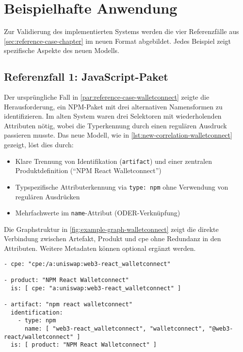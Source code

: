 \section{Beispielhafte Anwendung}\label{sec:beispiele-fertige-implementierung}

Zur Validierung des implementierten Systems werden die vier Referenzfälle aus \autoref{sec:reference-case-chapter} im neuen Format abgebildet.
Jedes Beispiel zeigt spezifische Aspekte des neuen Modells.

\subsection{Referenzfall 1: JavaScript-Paket}\label{subsec:example-js-package}

Der ursprüngliche Fall in \autoref{par:reference-case-walletconnect} zeigte die Herausforderung, ein NPM-Paket mit drei alternativen Namensformen zu identifizieren.
Im alten System waren drei Selektoren mit wiederholenden Attributen nötig, wobei die Typerkennung durch einen regulären Ausdruck passieren musste.
Das neue Modell, wie in \autoref{lst:new-correlation-walletconnect} gezeigt, löst dies durch:

\begin{itemize}
    \itemsep0em
    \item Klare Trennung von Identifikation (\texttt{artifact}) und einer zentralen Produktdefinition (\enquote{NPM React Walletconnect})
    \item Typspezifische Attributerkennung via \texttt{type: npm} ohne Verwendung von regulären Ausdrücken
    \item Mehrfachwerte im \texttt{name}-Attribut (ODER-Verknüpfung)
\end{itemize}

Die Graphstruktur in \autoref{fig:example-graph-walletconnect} zeigt die direkte Verbindung zwischen Artefakt, Produkt und \acrshort{cpe} ohne Redundanz in den Attributen.
Weitere Metadaten können optional ergänzt werden.

\begin{lstlisting}[style=yaml,caption={Produktmodellierung zu react-walletconnect},label={lst:new-correlation-walletconnect},basicstyle=\ttfamily\scriptsize]
- cpe: "cpe:/a:uniswap:web3-react_walletconnect"

- product: "NPM React Walletconnect"
  is: [ cpe: "a:uniswap:web3-react_walletconnect" ]

- artifact: "npm react walletconnect"
  identification:
    - type: npm
      name: [ "web3-react_walletconnect", "walletconnect", "@web3-react/walletconnect" ]
  is: [ product: "NPM React Walletconnect" ]
\end{lstlisting}

